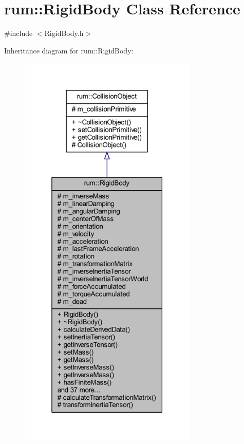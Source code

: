 \hypertarget{classrum_1_1_rigid_body}{}\section{rum\+:\+:Rigid\+Body Class Reference}
\label{classrum_1_1_rigid_body}


{\ttfamily \#include $<$Rigid\+Body.\+h$>$}



Inheritance diagram for rum\+:\+:Rigid\+Body\+:\nopagebreak
\begin{figure}[H]
\begin{center}
\leavevmode
\includegraphics[height=550pt]{classrum_1_1_rigid_body__inherit__graph}
\end{center}
\end{figure}



